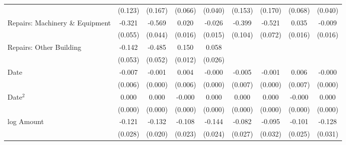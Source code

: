 {\begin{longtable}{l*{8}{c}}
                    &     (0.123)         &     (0.167)         &     (0.066)         &     (0.040)         &     (0.153)         &     (0.170)         &     (0.068)         &     (0.040)         \\
Repairs: Machinery \& Equipment&      -0.321\sym{***}&      -0.569\sym{***}&       0.020         &      -0.026         &      -0.399\sym{***}&      -0.521\sym{***}&       0.035\sym{*}  &      -0.009         \\
                    &     (0.055)         &     (0.044)         &     (0.016)         &     (0.015)         &     (0.104)         &     (0.072)         &     (0.016)         &     (0.016)         \\
Repairs: Other Building&      -0.142\sym{**} &      -0.485\sym{***}&       0.150\sym{***}&       0.058\sym{*}  &                     &                     &                     &                     \\
                    &     (0.053)         &     (0.052)         &     (0.012)         &     (0.026)         &                     &                     &                     &                     \\
Date                &      -0.007         &      -0.001\sym{***}&       0.004         &      -0.000\sym{***}&      -0.005         &      -0.001\sym{***}&       0.006         &      -0.000\sym{***}\\
                    &     (0.006)         &     (0.000)         &     (0.006)         &     (0.000)         &     (0.007)         &     (0.000)         &     (0.007)         &     (0.000)         \\
Date$^{2}$          &       0.000         &       0.000\sym{***}&      -0.000         &       0.000\sym{***}&       0.000         &       0.000\sym{***}&      -0.000         &       0.000\sym{***}\\
                    &     (0.000)         &     (0.000)         &     (0.000)         &     (0.000)         &     (0.000)         &     (0.000)         &     (0.000)         &     (0.000)         \\
log Amount          &      -0.121\sym{***}&      -0.132\sym{***}&      -0.108\sym{***}&      -0.144\sym{***}&      -0.082\sym{**} &      -0.095\sym{**} &      -0.101\sym{***}&      -0.128\sym{***}\\
                    &     (0.028)         &     (0.020)         &     (0.023)         &     (0.024)         &     (0.027)         &     (0.032)         &     (0.025)         &     (0.031)         \\

\end{longtable}}
